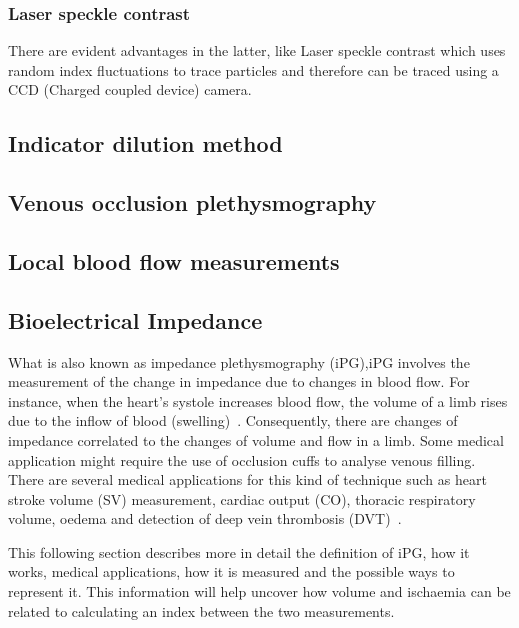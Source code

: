 \subsubsection{Laser speckle contrast}
\label{section literature LSC}
There are evident advantages in the latter, like Laser speckle contrast which uses random index fluctuations to trace particles and therefore can be traced using a CCD (Charged coupled device) camera. 


\subsection{Indicator dilution method}
\label{section literature dilution}

\subsection{Venous occlusion plethysmography}
\label{section literature VOP}

\subsection{Local blood flow measurements}
\label{section literature flow}


\subsection{Bioelectrical Impedance}
\label{section literature 3.5}
What is also known as impedance plethysmography (iPG),iPG involves the measurement of the change in impedance due to changes in blood flow. For instance, when the heart’s systole increases blood flow, the volume of a limb rises due to the inflow of blood (swelling)~\cite{martinsen2011bioimpedance}. Consequently, there are changes of impedance correlated to the changes of volume and flow in a limb. Some medical application might require the use of occlusion cuffs to analyse venous filling. There are several medical applications for this kind of technique such as heart stroke volume (SV) measurement, cardiac output (CO), thoracic respiratory volume, oedema and detection of deep vein thrombosis (DVT)~\cite{holohan1996plethysmography}.

This following section describes more in detail the definition of iPG, how it works, medical applications, how it is measured and the possible ways to represent it. This information will help uncover how volume and ischaemia can be related to calculating an index between the two measurements.

